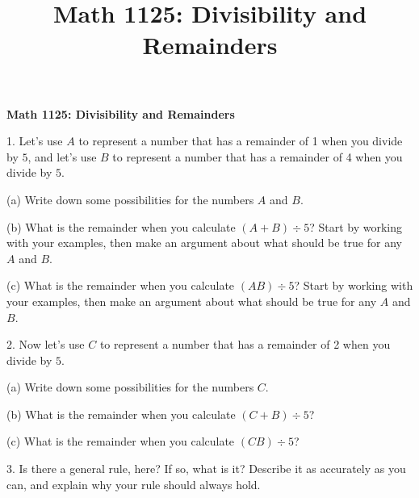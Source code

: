 \documentclass[11pt]{article}
\title{Math 1125: Divisibility and Remainders}
\date{}                                           %
\begin{document}
\begin{center} \bf Math 1125: Divisibility and Remainders \rm \end{center}

1. Let's use $A$ to represent a number that has a remainder of 1 when you divide by $5$, and let's use $B$ to represent a number that has a remainder of 4 when you divide by $5$.

(a) Write down some possibilities for the numbers $A$ and $B$.

\vskip 0.3in

(b) What is the remainder when you calculate $(A + B) \div 5$?  Start by working with your examples, then make an argument about what should be true for any $A$ and $B$.

\vskip 2in

(c) What is the remainder when you calculate $(AB) \div 5$?  Start by working with your examples, then make an argument about what should be true for any $A$ and $B$.

\vskip 2in

2.  Now let's use $C$ to represent a number that has a remainder of 2 when you divide by $5$.

(a) Write down some possibilities for the numbers $C$.

\vskip 0.3in

(b)  What is the remainder when you calculate $(C + B) \div 5$?  

\vskip 2in

(c) What is the remainder when you calculate $(CB) \div 5$?

\vskip 2in

3.  Is there a general rule, here?  If so, what is it?  Describe it as accurately as you can, and explain why your rule should always hold.
\end{document}
